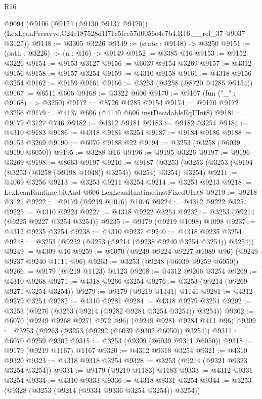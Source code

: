 \begin{lexlean}{R16}
\begin{coremodule}
  @9094
    (@9106
      (@9124 (@9130 @9137 @9120))
      (LexLeanPreserve.C24c187528d1f71c5fce57d0056e4e7b4.R16.__rel_37 @9037 @3127))
@9148 := @3305 @3226
@9149 := (state : @9148) -> @3250
@9151 := (path : @3226) -> (n : @16) -> @9149
@9152 := @3385 @16
@9153 := @9152 @3226
@9154 := @9153 @3127
@9156 := @6039 @9154 @3269
@9157 := @4312 @9156
@9158 := @9157 @3254
@9159 := @4310 @9158
@9161 := @4318 @9156 @3254
@9162 := @9159 @9161
@9166 := @3253 (@3258 (@8720 @4285 @9154))
@9167 := @6511 @606
@9168 := @3322 @606
@9170 := @9167 (fun ("_" : @9168) => @3250)
@9172 := @8726 @4285 @9154
@9174 := @9170 @9172 @3256
@9179 := @4137 @606 (@4140 @606 instDecidableEqUInt8)
@9181 := @9179 @3127 @746
@9182 := @4312 @9181
@9183 := @9182 @3254
@9184 := @4310 @9183
@9186 := @4318 @9181 @3254
@9187 := @9184 @9186
@9188 := @9153 @3269
@9190 := @6070 @9188 @22
@9194 := @3253 (@3258 (@6039 @9190 @6050))
@9195 := @3288 @16
@9196 := @9195 @3226
@9197 := @9196 @3269
@9198 := @8663 @9197
@9210 := @9187 (@3253 (@3253 (@3253 (@9194 (@3253 (@3258 (@9198 @1048)) @3254)) @3254) @3254) @3254)
@9211 := @4069 @3256
@9213 := @3253 @9211 @3254
@9214 := @3253 @9213
@9218 := LexLeanRuntime.bitAnd @606 LexLeanRuntime.instFixedUInt8
@9219 := @9218 @3127
@9222 := @9179 (@9219 @1076) @1076
@9224 := @4312 @9222 @3254
@9225 := @4310 @9224
@9227 := @4318 @9222 @3254
@9232 := @3253 (@9214 (@9225 @9227 @3254 @3254))
@9235 := @9179 (@9219 @1098) @1098
@9237 := @4312 @9235 @3254
@9238 := @4310 @9237
@9240 := @4318 @9235 @3254
@9248 := @3253 (@9232 (@3253 (@9214 (@9238 @9240 @3254 @3254)) @3254))
@9249 := @4309 @16
@9259 := @6070 (@9249 @9224 @9227 @1089 @96) (@9249 @9237 @9240 @1111 @96)
@9263 := @3253 (@9248 (@6039 @9259 @6050))
@9266 := @9179 (@9219 @1123) @1123
@9268 := @4312 @9266 @3254
@9269 := @4310 @9268
@9271 := @4318 @9266 @3254
@9276 := @3253 (@9214 (@9269 @9271 @3254 @3254))
@9279 := @9179 (@9219 @1141) @1141
@9281 := @4312 @9279 @3254
@9282 := @4310 @9281
@9284 := @4318 @9279 @3254
@9292 := @3253 (@9276 (@3253 (@9214 (@9282 @9284 @3254 @3254)) @3254))
@9302 := @6070 (@9249 @9268 @9271 @972 @96) (@9249 @9281 @9284 @411 @96)
@9309 := @3253 (@9263 (@3253 (@9292 (@6039 @9302 @6050)) @3254))
@9311 := @6070 @9259 @9302
@9315 := @3253 (@9309 (@6039 @9311 @6050))
@9318 := @9179 (@9219 @1167) @1167
@9320 := @4312 @9318 @3254
@9321 := @4310 @9320
@9323 := @4318 @9318 @3254
@9328 := @3253 (@9214 (@9321 @9323 @3254 @3254))
@9331 := @9179 (@9219 @1183) @1183
@9333 := @4312 @9331 @3254
@9334 := @4310 @9333
@9336 := @4318 @9331 @3254
@9344 := @3253 (@9328 (@3253 (@9214 (@9334 @9336 @3254 @3254)) @3254))

\end{coremodule}
\end{lexlean}
